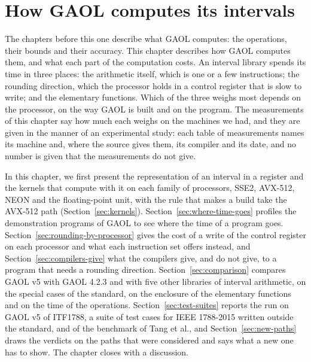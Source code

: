 \chapter{How GAOL computes its intervals}\label{chap:computing}

The chapters before this one describe what GAOL computes: the operations,
their bounds and their accuracy. This chapter describes how GAOL computes
them, and what each part of the computation costs. An interval library
spends its time in three places: the arithmetic itself, which is one or a
few instructions; the rounding direction, which the processor holds in a
control register that is slow to write; and the elementary functions. Which
of the three weighs most depends on the processor, on the way GAOL is built
and on the program. The measurements of this chapter say how much each
weighs on the machines we had, and they are given in the manner of an
experimental study: each table of measurements names its machine and, where the source gives them, its compiler and its date,
and no number is given that the measurements do not give.

\medskip
In this chapter, we first present the representation of an interval in a
register and the kernels that compute with it on each family of processors,
SSE2, AVX-512, NEON and the floating-point unit, with the rule that makes a
build take the AVX-512 path (Section~\ref{sec:kernels}).
Section~\ref{sec:where-time-goes} profiles the demonstration programs of GAOL
to see where the time of a program goes.
Section~\ref{sec:rounding-by-processor} gives the cost of a write of the
control register on each processor and what each instruction set offers
instead, and Section~\ref{sec:compilers-give} what the compilers give, and
do not give, to a program that needs a rounding direction.
Section~\ref{sec:comparison} compares GAOL v5 with GAOL 4.2.3 and with five
other libraries of interval arithmetic, on the special cases of the standard,
on the enclosure of the elementary functions and on the time of the
operations. Section~\ref{sec:test-suites} reports the run on GAOL v5 of ITF1788,
a suite of test cases for IEEE 1788-2015 written outside the standard, and of
the benchmark of Tang et al., and Section~\ref{sec:new-paths} draws the
verdicts on the paths that were considered and says what a new one has to
show. The chapter closes with a discussion.

